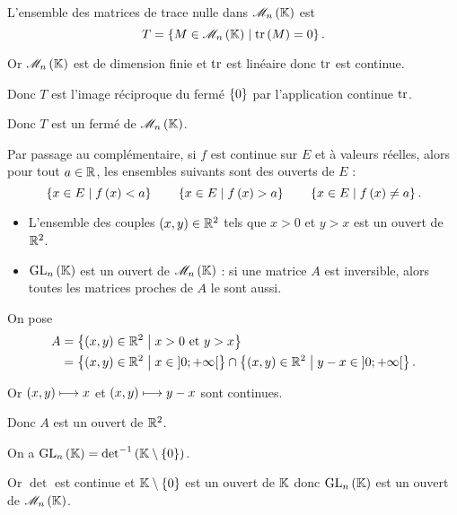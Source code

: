 \begin{dem}
L'ensemble des matrices de trace nulle dans \(\M{n}\) est \[T=\accol{M\in\M{n}\tq\tr\paren{M}=0}.\]

Or \(\M{n}\) est de dimension finie et \(\operatorname{tr}\) est linéaire donc \(\operatorname{tr}\) est continue.

Donc \(T\) est l'image réciproque du fermé \(\left\lbrace0\right\rbrace\) par l'application continue \(\operatorname{tr}\).

Donc \(T\) est un fermé de \(\M{n}\).
\end{dem}

Par passage au complémentaire, si \(f\) est continue sur \(E\) et à valeurs réelles, alors pour tout \(a\in\mathbb{R}\), les ensembles suivants sont des ouverts de \(E\) : \[\left\lbrace x\in E\;\middle|\; f\left(x\right)<a\right\rbrace\qquad\left\lbrace x\in E\;\middle|\; f\left(x\right)>a\right\rbrace\qquad\left\lbrace x\in E\;\middle|\; f\left(x\right)\not=a\right\rbrace.\]

\begin{ex}
\begin{itemize}
    \item L'ensemble des couples \(\left(x,y\right)\in\mathbb{R}^2\) tels que \(x>0\) et \(y>x\) est un ouvert de \(\mathbb{R}^2\). \\
    \item \(\GL{n}\) est un ouvert de \(\M{n}\) : si une matrice \(A\) est inversible, alors toutes les matrices proches de \(A\) le sont aussi.
\end{itemize}
\end{ex}

\begin{dem}
On pose \[\begin{aligned}
A&=\left\lbrace\left(x,y\right)\in\mathbb{R}^2\;\middle|\; x>0\text{ et }y>x\right\rbrace \\
&=\left\lbrace\left(x,y\right)\in\mathbb{R}^2\;\middle|\; x\in\left]0;+\infty\right[\right\rbrace\cap\left\lbrace\left(x,y\right)\in\mathbb{R}^2\;\middle|\; y-x\in\left]0;+\infty\right[\right\rbrace.
\end{aligned}\]

Or \(\left(x,y\right)\longmapsto x\) et \(\left(x,y\right)\longmapsto y-x\) sont continues.

Donc \(A\) est un ouvert de \(\mathbb{R}^2\).
\end{dem}

\begin{dem}[\(\GL{n}\)]
On a \(\GL{n}={\det}\inv\paren{\K\excluant\accol{0}}\).

Or \(\det\) est continue et \(\mathbb{K}\setminus\left\lbrace0\right\rbrace\) est un ouvert de \(\mathbb{K}\) donc \(\GL{n}\) est un ouvert de \(\M{n}\).
\end{dem}

